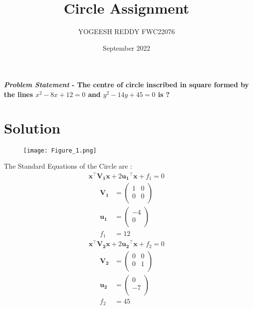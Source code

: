 \documentclass[journal,10pt,twocolumn]{article}
\title{\textbf{Circle Assignment}}
\author{YOGEESH REDDY \hspace{9cm} FWC22076}
\date{September 2022}
\let\vec\mathbf
\begin{document}
\maketitle
\paragraph{\textit{Problem Statement} - The centre of  circle inscribed in square formed by the lines \(x^2-8x+12=0\) and \(y^2-14y+45=0\)  is ?}

\section*{\large Solution}

\begin{figure}[H]
\centering
\texttt{[image: Figure\_1.png]}

\label{fig:triangle}
\end{figure}
 
The Standard Equations of the Circle are :
    \begin{align}
\vec{x}^{\top}\vec{V_1}\vec{x}+2\vec{u_1}^{\top}\vec{x}+f_1=0
\end{align}  
\begin{align}
\vec{V_1}&=\begin{pmatrix}
	1 & 0\\
	0 & 0\\
	\end{pmatrix} \\
    \vec{u_1}&=\begin{pmatrix}
	-4\\
	0 \\
	\end{pmatrix} \\
	f_1&=12
	\end{align}
	   \begin{align}
\vec{x}^{\top}\vec{V_2}\vec{x}+2\vec{u_2}^{\top}\vec{x}+f_2=0
\end{align}  
	\begin{align}
\vec{V_2}&=\begin{pmatrix}
	0 & 0\\
	0 & 1\\
	\end{pmatrix} \\
    \vec{u_2}&=\begin{pmatrix}
	0\\
	-7 \\
	\end{pmatrix} \\
	f_2&=45
	\end{align}
\end{document}
